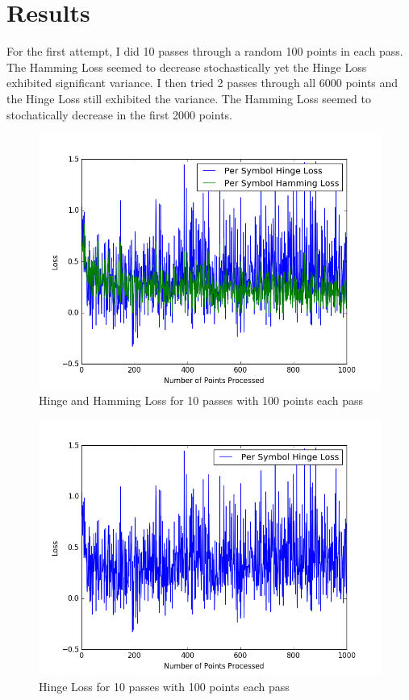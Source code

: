 \documentclass[twoside,11pt]{article}
\theoremstyle{definition}
\begin{document}
\newpage

\section*{Results}

For the first attempt, I did 10 passes through a random 100 points in each pass. The Hamming Loss seemed to decrease stochastically yet the Hinge Loss exhibited significant variance. I then tried 2 passes through all 6000 points and the Hinge Loss still exhibited the variance. The Hamming Loss seemed to stochatically decrease in the first 2000 points.

\begin{figure}[h]
\centering
\includegraphics[width=5in]{hingeHammingLoss1.png}
\caption{Hinge and Hamming Loss for 10 passes with 100 points each pass}
\end{figure}

\begin{figure}[h]
\centering
\includegraphics[width=5in]{hingeLoss1.png}
\caption{Hinge Loss for 10 passes with 100 points each pass}
\end{figure}
\end{document}
